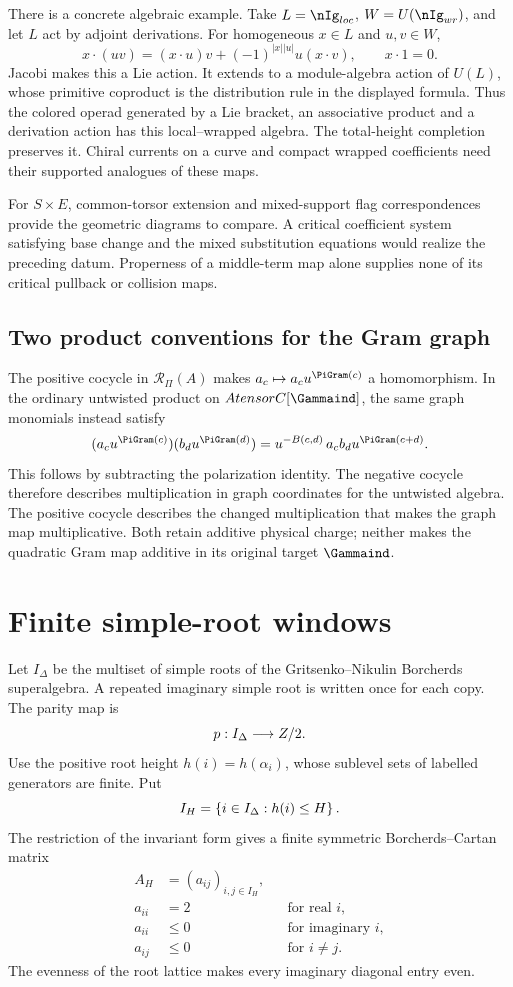There is a concrete algebraic example. Take
\(L=\nIg_{\loc}\), \(W=U(\nIg_{\wrap})\), and let \(L\)
act by adjoint derivations. For homogeneous \(x\in L\) and
\(u,v\in W\),
\[
 x\cdot(uv)=(x\cdot u)v+(-1)^{|x||u|}u(x\cdot v),
 \qquad x\cdot1=0.
\]
Jacobi makes this a Lie action. It extends to a module-algebra
action of \(U(L)\), whose primitive coproduct is the distribution
rule in the displayed formula. Thus the colored operad generated
by a Lie bracket, an associative product and a derivation action has
this local--wrapped algebra. The total-height completion preserves
it. Chiral currents on a curve and compact wrapped coefficients
need their supported analogues of these maps.

For \(S\times E\), common-torsor extension and mixed-support
flag correspondences provide the geometric diagrams to compare.
A critical coefficient system satisfying base change and the mixed
substitution equations would realize the preceding datum. Properness
of a middle-term map alone supplies none of its critical pullback
or collision maps.

\subsection{Two product conventions for the Gram graph}
The positive cocycle in \(\mathcal R_\Pi(A)\) makes
\(a_c\mapsto a_cu^{\PiGram(c)}\) a homomorphism. In the
ordinary untwisted product on \(A\otimes\mathbb C[\Gammaind]\),
the same graph monomials instead satisfy
\[
 (a_cu^{\PiGram(c)})(b_du^{\PiGram(d)})
 =u^{-B(c,d)}\,a_cb_du^{\PiGram(c+d)}.
\]
This follows by subtracting the polarization identity. The negative
cocycle therefore describes multiplication in graph coordinates
for the untwisted algebra. The positive cocycle describes the
changed multiplication that makes the graph map multiplicative.
Both retain additive physical charge; neither makes the quadratic
Gram map additive in its original target \(\Gammaind\).

\section{Finite simple-root windows}
Let $I_\Delta$ be the multiset of simple roots of the Gritsenko--Nikulin Borcherds superalgebra.  A repeated imaginary simple root is written once for each copy.  The parity map is
\[
 p:I_\Delta\longrightarrow Z/2.
\]
Use the positive root height \(h(i)=h(\alpha_i)\), whose
sublevel sets of labelled generators are finite.  Put
\[
 I_H=\left\{i\in I_\Delta:h(i)\le H\right\}.
\]
The restriction of the invariant form gives a finite symmetric Borcherds--Cartan matrix
\[
\begin{aligned}
 A_H&=(a_{ij})_{i,j\in I_H},\\
 a_{ii}&=2 &&\text{for real }i,\\
 a_{ii}&\leq0 &&\text{for imaginary }i,\\
 a_{ij}&\leq0 &&\text{for }i\neq j.
\end{aligned}
\]
The evenness of the root lattice makes every imaginary diagonal entry even.


